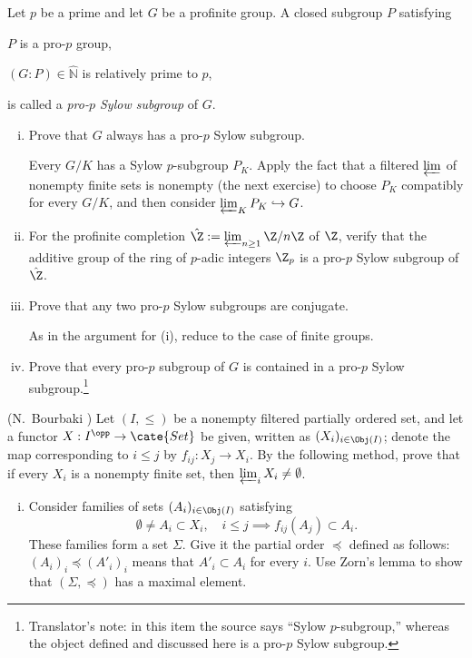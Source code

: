 \begin{Exercises}
	\item Let $p$ be a prime and let $G$ be a profinite group. A closed subgroup $P$ satisfying
	\begin{inparaenum}
		\item $P$ is a pro-$p$ group,
		\item $(G:P)\in\hat{\mathbb{N}}$ is relatively prime to $p$,
	\end{inparaenum}
	is called a \emph{pro-$p$ Sylow subgroup} of $G$.
	\begin{enumerate}[(i)]
		\item Prove that $G$ always has a pro-$p$ Sylow subgroup.
		\begin{hint}
			Every $G/K$ has a Sylow $p$-subgroup $P_K$. Apply the fact that a filtered $\varprojlim$ of nonempty finite sets is nonempty (the next exercise) to choose $P_K$ compatibly for every $G/K$, and then consider $\varprojlim_KP_K\hookrightarrow G$.
		\end{hint}
		\item For the profinite completion $\hat{\Z}:=\varprojlim_{n\geq 1}\Z/n\Z$ of $\Z$, verify that the additive group of the ring of $p$-adic integers $\Z_p$ is a pro-$p$ Sylow subgroup of $\hat{\Z}$.
		\item Prove that any two pro-$p$ Sylow subgroups are conjugate.
		\begin{hint}
			As in the argument for (i), reduce to the case of finite groups.
		\end{hint}
		\item Prove that every pro-$p$ subgroup of $G$ is contained in a pro-$p$ Sylow subgroup.\footnote{Translator's note: in this item the source says ``Sylow $p$-subgroup,'' whereas the object defined and discussed here is a pro-$p$ Sylow subgroup.}
	\end{enumerate}

	\item (N.\ Bourbaki \cite[III.58 Th\'eor\`eme 1]{BouE}) Let $(I,\leq)$ be a nonempty filtered partially ordered set, and let a functor $X:I^{\opp}\to\cate{Set}$ be given, written as $(X_i)_{i\in\Obj(I)}$; denote the map corresponding to $i\leq j$ by $f_{ij}:X_j\to X_i$. By the following method, prove that if every $X_i$ is a nonempty finite set, then $\varprojlim_iX_i\neq\emptyset$.
	\begin{enumerate}[(i)]
		\item Consider families of sets $(A_i)_{i\in\Obj(I)}$ satisfying
		\[ \emptyset \neq A_i \subset X_i, \quad i \leq j \implies f_{ij}(A_j) \subset A_i . \]
		These families form a set $\Sigma$. Give it the partial order $\preceq$ defined as follows: $(A_i)_i\preceq(A'_i)_i$ means that $A'_i\subset A_i$ for every $i$. Use Zorn's lemma to show that $(\Sigma,\preceq)$ has a maximal element.


\end{enumerate}
\end{Exercises}
